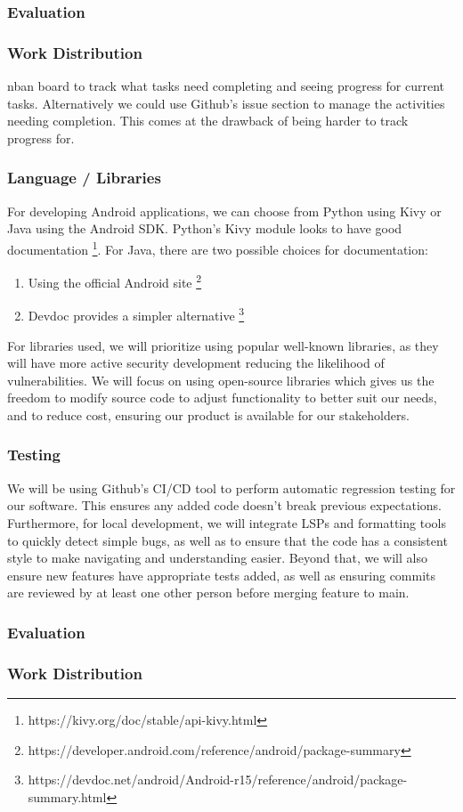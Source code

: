 \subsubsection{Evaluation}
\subsubsection{Work Distribution}
nban board to track what tasks need completing and seeing
progress for current tasks. Alternatively we could use Github's issue section to manage
the activities needing completion. This comes at the drawback of being harder to track progress
for.
\subsubsection{Language / Libraries}

For developing Android applications, we can choose from Python using Kivy or Java using the Android SDK.
Python's Kivy module looks to have good documentation
\footnote{https://kivy.org/doc/stable/api-kivy.html}.
For Java, there are two possible choices for documentation:
\begin{enumerate}
  \item Using the official Android site
    \footnote{https://developer.android.com/reference/android/package-summary}
  \item Devdoc provides a simpler alternative
    \footnote{https://devdoc.net/android/Android-r15/reference/android/package-summary.html}
\end{enumerate}
\par
For libraries used, we will prioritize using popular well-known libraries, as they will have more
active security development reducing the likelihood of vulnerabilities. We will focus on using
open-source libraries which gives us the freedom to modify source code to adjust functionality to
better suit our needs, and to reduce cost, ensuring our product is available for our stakeholders.

\subsubsection{Testing}
We will be using Github's CI/CD tool to perform automatic regression testing for our software.
This ensures any added code doesn't break previous expectations.
Furthermore, for local development, we will integrate LSPs and formatting tools to quickly detect
simple bugs, as well as to ensure that the code has a consistent style to make navigating and understanding easier.
Beyond that, we will also ensure new features have appropriate tests added, as well as ensuring commits are
reviewed by at least one other person before merging feature to main.
\subsubsection{Evaluation}
\subsubsection{Work Distribution}
